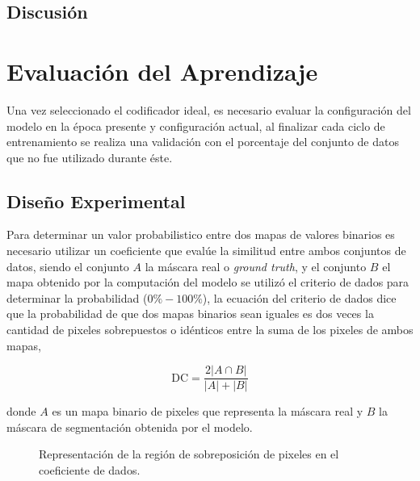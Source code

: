 \subsection{Discusión}

\section{Evaluación del Aprendizaje}
Una vez seleccionado el codificador ideal, es necesario evaluar la configuración del modelo en la época presente y configuración actual, al finalizar cada ciclo de entrenamiento se realiza una validación con el porcentaje del conjunto de datos que no fue utilizado durante éste.
\subsection{Diseño Experimental}
Para determinar un valor probabilistico entre dos mapas de valores binarios es necesario utilizar un coeficiente que evalúe la similitud entre ambos conjuntos de datos, siendo el conjunto $A$ la máscara real o \emph{ground truth}, y el conjunto $B$ el mapa obtenido por la computación del modelo se utilizó el criterio de dados para determinar la probabilidad ($0 \% - 100 \%$), la ecuación del criterio de dados dice que la probabilidad de que dos mapas binarios sean iguales es dos veces la cantidad de pixeles sobrepuestos o idénticos entre la suma de los pixeles de ambos mapas, 

\begin{equation}\label{eq:diceloss}
    \text{DC} = \frac{2|A \cap B |}{|A| + |B|}
\end{equation}

donde $A$ es un mapa binario de pixeles que representa la máscara real y $B$ la máscara de segmentación obtenida por el modelo.

\def\firstcircle{(0,0) circle (1.5cm)}
\def\secondcircle{(2,0) circle (1.5cm)}
\def\thirdcircle{(0:2cm) circle (1.5cm)}

\begin{figure}[b]
    \centering
    \caption{Representación de la región de sobreposición de pixeles en el coeficiente de dados.}
\end{figure}

